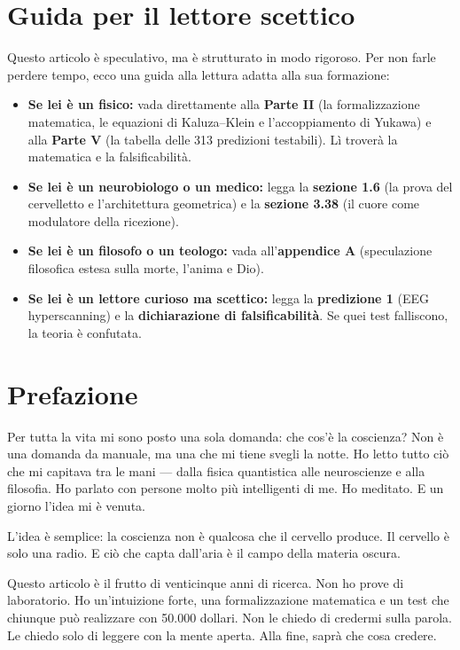 \documentclass[11pt,a4paper]{article}
\begin{document}
\section*{Guida per il lettore scettico}
Questo articolo è speculativo, ma è strutturato in modo rigoroso. Per non farle perdere tempo, ecco una guida alla lettura adatta alla sua formazione:
\begin{itemize}
    \item \textbf{Se lei è un fisico:} vada direttamente alla \textbf{Parte II} (la formalizzazione matematica, le equazioni di Kaluza--Klein e l'accoppiamento di Yukawa) e alla \textbf{Parte V} (la tabella delle 313 predizioni testabili). Lì troverà la matematica e la falsificabilità.
    \item \textbf{Se lei è un neurobiologo o un medico:} legga la \textbf{sezione 1.6} (la prova del cervelletto e l'architettura geometrica) e la \textbf{sezione 3.38} (il cuore come modulatore della ricezione).
    \item \textbf{Se lei è un filosofo o un teologo:} vada all'\textbf{appendice A} (speculazione filosofica estesa sulla morte, l'anima e Dio).
    \item \textbf{Se lei è un lettore curioso ma scettico:} legga la \textbf{predizione 1} (EEG hyperscanning) e la \textbf{dichiarazione di falsificabilità}. Se quei test falliscono, la teoria è confutata.
\end{itemize}

\section*{Prefazione}
Per tutta la vita mi sono posto una sola domanda: che cos'è la coscienza? Non è una domanda da manuale, ma una che mi tiene svegli la notte. Ho letto tutto ciò che mi capitava tra le mani --- dalla fisica quantistica alle neuroscienze e alla filosofia. Ho parlato con persone molto più intelligenti di me. Ho meditato. E un giorno l'idea mi è venuta.

L'idea è semplice: la coscienza non è qualcosa che il cervello produce. Il cervello è solo una radio. E ciò che capta dall'aria è il campo della materia oscura.

Questo articolo è il frutto di venticinque anni di ricerca. Non ho prove di laboratorio. Ho un'intuizione forte, una formalizzazione matematica e un test che chiunque può realizzare con 50.000 dollari. Non le chiedo di credermi sulla parola. Le chiedo solo di leggere con la mente aperta. Alla fine, saprà che cosa credere.
\end{document}
